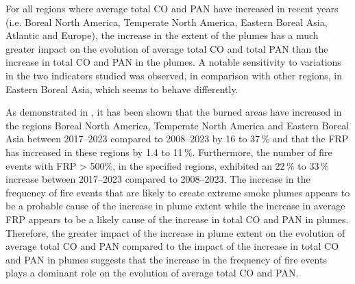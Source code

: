 \documentclass[acp, manuscript]{copernicus}
\begin{document}
For all regions where average total CO and PAN have increased in recent years (i.e. Boreal North America, Temperate North America, Eastern Boreal Asia, Atlantic and Europe), the increase in the extent of the plumes has a much greater impact on the evolution of average total CO and total PAN than the increase in total CO and PAN in the plumes. A notable sensitivity to variations in the two indicators studied was observed, in comparison with other regions, in Eastern Boreal Asia, which seems to behave differently.

As demonstrated in \citet{ehretIncreaseCarbonMonoxide2025}, it has been shown that the burned areas have increased in the regions Boreal North America, Temperate North America and Eastern Boreal Asia between 2017--2023 compared to 2008--2023 by 16 to 37\,\% and that the FRP has increased in these regions by 1.4 to 11\,\%. Furthermore, the number of fire events with FRP > 500\%, in the specified regions, exhibited an 22\,\% to 33\,\% increase between 2017--2023 compared to 2008--2023. The increase in the frequency of fire events that are likely to create extreme smoke plumes appears to be a probable cause of the increase in plume extent while the increase in average FRP appears to be a likely cause of the increase in total CO and PAN in plumes. Therefore, the greater impact of the increase in plume extent on the evolution of average total CO and PAN compared to the impact of the increase in total CO and PAN in plumes suggests that the increase in the frequency of fire events plays a dominant role on the evolution of average total CO and PAN.


\end{document}
